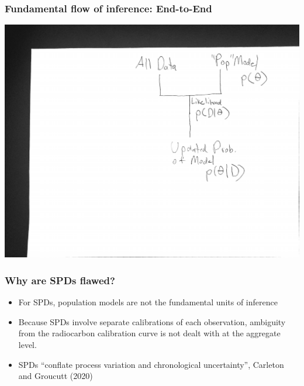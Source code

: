 \documentclass{beamer}
\begin{document}
\begin{frame}[t]
  \frametitle{Fundamental flow of inference: End-to-End}
    \includegraphics[height=.85\textheight]{e2e_flow.pdf}
\end{frame}

\begin{frame}[t]
  \frametitle{Why are SPDs flawed?}
  \begin{itemize}
    \item For SPDs, population models are not the fundamental units of inference
    \pause
    \item Because SPDs involve separate calibrations of each observation, ambiguity from the radiocarbon calibration curve is not dealt with at the aggregate level.
    
    \item SPDs ``conflate process variation and chronological uncertainty'', Carleton and Groucutt (2020)
    
  \end{itemize}
\end{frame}
\end{document}
